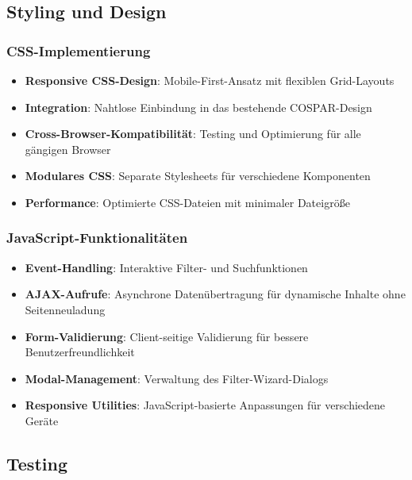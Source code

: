 \documentclass[11pt,a4paper]{article}
\begin{document}
\subsection{Styling und Design}

\subsubsection{CSS-Implementierung}
\begin{itemize}
    \item \textbf{Responsive CSS-Design}: Mobile-First-Ansatz mit flexiblen Grid-Layouts
    \item \textbf{Integration}: Nahtlose Einbindung in das bestehende COSPAR-Design
    \item \textbf{Cross-Browser-Kompatibilität}: Testing und Optimierung für alle gängigen Browser
    \item \textbf{Modulares CSS}: Separate Stylesheets für verschiedene Komponenten
    \item \textbf{Performance}: Optimierte CSS-Dateien mit minimaler Dateigröße
\end{itemize}

\subsubsection{JavaScript-Funktionalitäten}
\begin{itemize}
    \item \textbf{Event-Handling}: Interaktive Filter- und Suchfunktionen
    \item \textbf{AJAX-Aufrufe}: Asynchrone Datenübertragung für dynamische Inhalte ohne Seitenneuladung
    \item \textbf{Form-Validierung}: Client-seitige Validierung für bessere Benutzerfreundlichkeit
    \item \textbf{Modal-Management}: Verwaltung des Filter-Wizard-Dialogs
    \item \textbf{Responsive Utilities}: JavaScript-basierte Anpassungen für verschiedene Geräte
\end{itemize}

\subsection{Testing}
\end{document}
